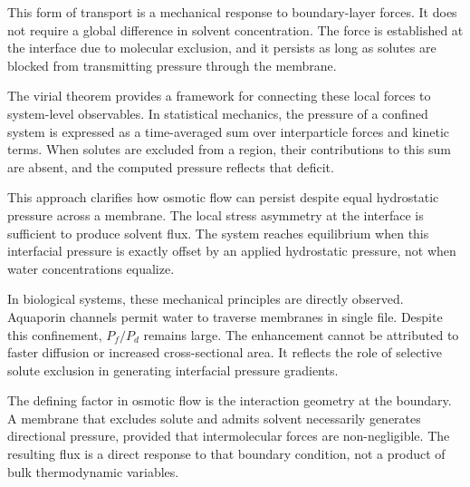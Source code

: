 This form of transport is a mechanical response to boundary-layer forces. It does not require a global difference in solvent concentration. The force is established at the interface due to molecular exclusion, and it persists as long as solutes are blocked from transmitting pressure through the membrane.

The virial theorem provides a framework for connecting these local forces to system-level observables. In statistical mechanics, the pressure of a confined system is expressed as a time-averaged sum over interparticle forces and kinetic terms. When solutes are excluded from a region, their contributions to this sum are absent, and the computed pressure reflects that deficit.

This approach clarifies how osmotic flow can persist despite equal hydrostatic pressure across a membrane. The local stress asymmetry at the interface is sufficient to produce solvent flux. The system reaches equilibrium when this interfacial pressure is exactly offset by an applied hydrostatic pressure, not when water concentrations equalize.

In biological systems, these mechanical principles are directly observed. Aquaporin channels permit water to traverse membranes in single file. Despite this confinement, $P_f / P_d$ remains large. The enhancement cannot be attributed to faster diffusion or increased cross-sectional area. It reflects the role of selective solute exclusion in generating interfacial pressure gradients.

The defining factor in osmotic flow is the interaction geometry at the boundary. A membrane that excludes solute and admits solvent necessarily generates directional pressure, provided that intermolecular forces are non-negligible. The resulting flux is a direct response to that boundary condition, not a product of bulk thermodynamic variables.




